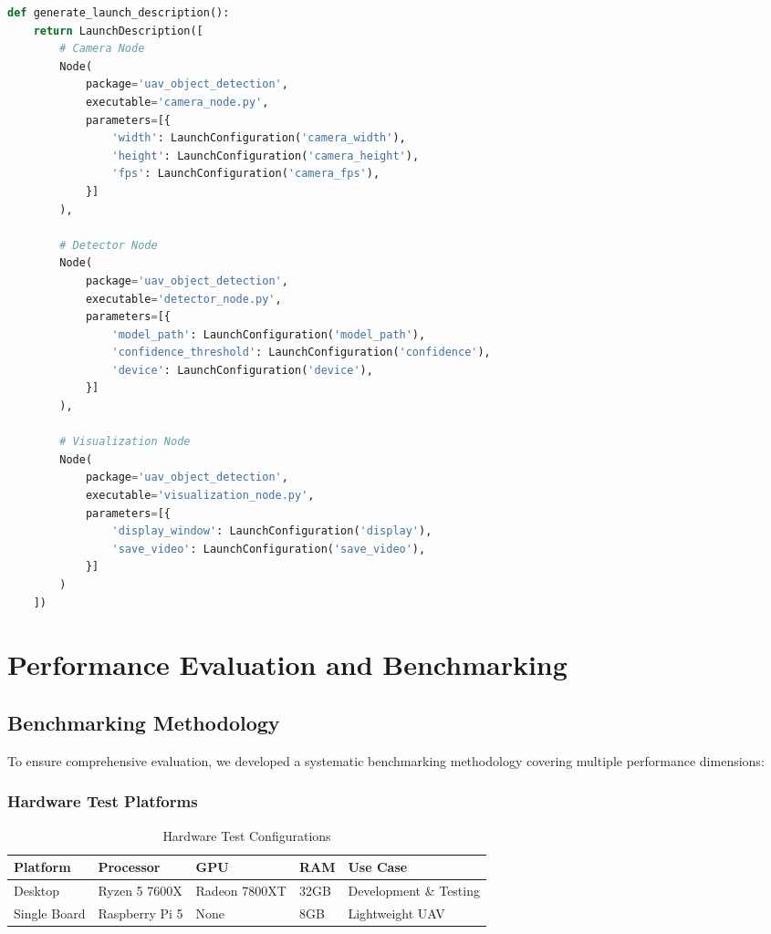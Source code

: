 \documentclass[11pt,a4paper]{article}
\begin{document}
\begin{lstlisting}[language=Python, caption=Launch File Example]
def generate_launch_description():
    return LaunchDescription([
        # Camera Node
        Node(
            package='uav_object_detection',
            executable='camera_node.py',
            parameters=[{
                'width': LaunchConfiguration('camera_width'),
                'height': LaunchConfiguration('camera_height'),
                'fps': LaunchConfiguration('camera_fps'),
            }]
        ),
        
        # Detector Node
        Node(
            package='uav_object_detection',
            executable='detector_node.py',
            parameters=[{
                'model_path': LaunchConfiguration('model_path'),
                'confidence_threshold': LaunchConfiguration('confidence'),
                'device': LaunchConfiguration('device'),
            }]
        ),
        
        # Visualization Node
        Node(
            package='uav_object_detection',
            executable='visualization_node.py',
            parameters=[{
                'display_window': LaunchConfiguration('display'),
                'save_video': LaunchConfiguration('save_video'),
            }]
        )
    ])
\end{lstlisting}

\section{Performance Evaluation and Benchmarking}

\subsection{Benchmarking Methodology}

To ensure comprehensive evaluation, we developed a systematic benchmarking methodology covering multiple performance dimensions:

\subsubsection{Hardware Test Platforms}

\begin{table}[H]
\centering
\caption{Hardware Test Configurations}
\begin{tabular}{@{}lllll@{}}
\toprule
\textbf{Platform} & \textbf{Processor} & \textbf{GPU} & \textbf{RAM} & \textbf{Use Case} \\
\midrule
Desktop & Ryzen 5 7600X & Radeon 7800XT & 32GB & Development \& Testing \\
Single Board & Raspberry Pi 5 & None & 8GB & Lightweight UAV \\
\bottomrule
\end{tabular}
\end{table}
\end{document}

